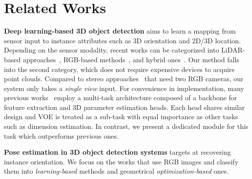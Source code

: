 \documentclass[final]{cvpr}
\begin{document}
\section {Related Works}
\label{RW}
\noindent \textbf{Deep learning-based 3D object detection} aims to learn a mapping from sensor input to instance attributes such as 3D orientation and 2D/3D location. Depending on the sensor modality, recent works can be categorized into LiDAR-based approaches~\cite{zhou2018voxelnet, lang2019pointpillars, shi2019pointrcnn, yang2019std, zhao20193d, shi2020point, meng2020weakly}, RGB-based methods~\cite{mousavian20173d, xu2018multi, roddick2019orthographic, simonelli2019disentangling, li2019stereo, cai2020monocular}, and hybrid ones~\cite{xu2018pointfusion, vora2020pointpainting}. Our method falls into the second category, which does not require expensive devices to acquire point clouds. Compared to stereo approaches~\cite{li2018stereo, li2019stereo, xu2020zoomnet, chen2020dsgn} that need two RGB cameras, our system only takes a \emph{single view} input. For convenience in implementation, many previous works~\cite{kundu20183d, brazil2019m3d, Ding_2020_CVPR, liu2020smoke, Ma_2020_ECCV, shi2020distance} employ a multi-task architecture composed of a backbone for feature extraction and 3D parameter estimation heads. Each head shares similar design and VOE is treated as a sub-task with equal importance as other tasks such as dimension estimation. In contrast, we present a dedicated module for this task which outperforms previous ones.   

\noindent \textbf{Pose estimation in 3D object detection systems} targets at recovering instance orientation. We focus on the works that use RGB images and classify them into \emph{learning-based} methods and geometrical \emph{optimization-based} ones. 
\end{document}
